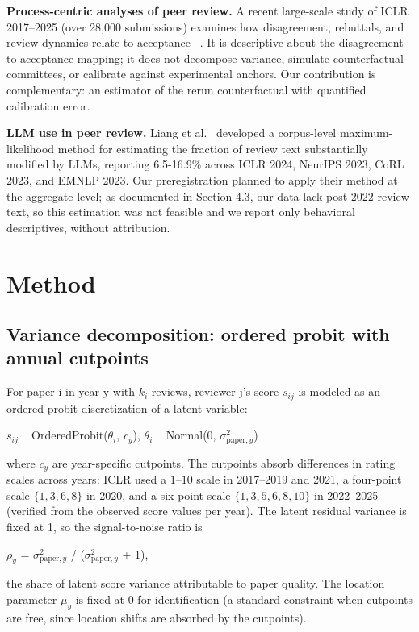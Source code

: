 \documentclass[10pt]{article}
\begin{document}
\textbf{Process-centric analyses of peer review.} A recent large-scale study of ICLR 2017--2025 (over 28,000 submissions) examines how disagreement, rebuttals, and review dynamics relate to acceptance ~\citep{acceptance2025}. It is descriptive about the disagreement-to-acceptance mapping; it does not decompose variance, simulate counterfactual committees, or calibrate against experimental anchors. Our contribution is complementary: an estimator of the rerun counterfactual with quantified calibration error.

\textbf{LLM use in peer review.} Liang et al.~\citep{liang2024} developed a corpus-level maximum-likelihood method for estimating the fraction of review text substantially modified by LLMs, reporting 6.5-16.9\% across ICLR 2024, NeurIPS 2023, CoRL 2023, and EMNLP 2023. Our preregistration planned to apply their method at the aggregate level; as documented in Section 4.3, our data lack post-2022 review text, so this estimation was not feasible and we report only behavioral descriptives, without attribution.

\section{Method}

\subsection{Variance decomposition: ordered probit with annual cutpoints}

For paper i in year y with $k_i$ reviews, reviewer j's score $s_{ij}$ is modeled as an ordered-probit discretization of a latent variable:

$s_{ij}$ ~ OrderedProbit($\theta_i$, $c_y$), $\theta_i$ ~ Normal(0, $\sigma^2_{\mathrm{paper},y}$)

where $c_y$ are year-specific cutpoints. The cutpoints absorb differences in rating scales across years: ICLR used a $1$--$10$ scale in 2017--2019 and 2021, a four-point scale $\{1,3,6,8\}$ in 2020, and a six-point scale $\{1,3,5,6,8,10\}$ in 2022--2025 (verified from the observed score values per year). The latent residual variance is fixed at 1, so the signal-to-noise ratio is

$\rho_y$ = $\sigma^2_{\mathrm{paper},y}$ / ($\sigma^2_{\mathrm{paper},y}$ + 1),

the share of latent score variance attributable to paper quality. The location parameter $\mu_y$ is fixed at 0 for identification (a standard constraint when cutpoints are free, since location shifts are absorbed by the cutpoints).
\end{document}
